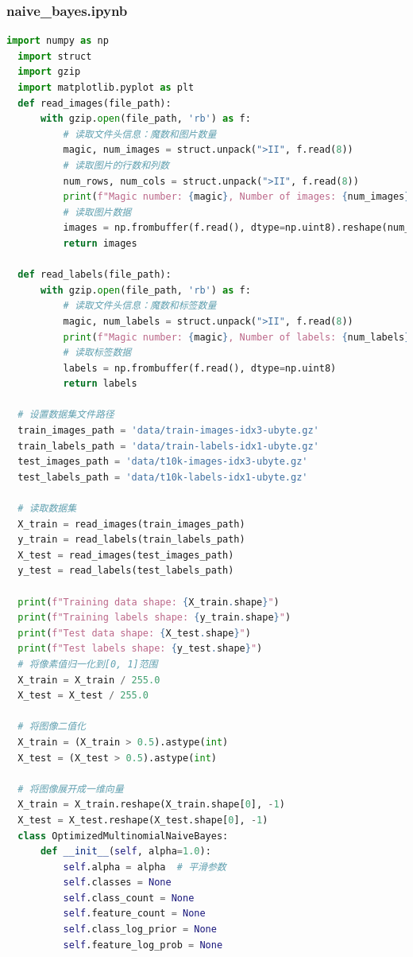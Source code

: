\documentclass[12pt]{article}
\begin{document}
\subsubsection{naive\_bayes.ipynb}
\begin{lstlisting}[language=Python]
  import numpy as np
  import struct
  import gzip
  import matplotlib.pyplot as plt
  def read_images(file_path):
      with gzip.open(file_path, 'rb') as f:
          # 读取文件头信息：魔数和图片数量
          magic, num_images = struct.unpack(">II", f.read(8))
          # 读取图片的行数和列数
          num_rows, num_cols = struct.unpack(">II", f.read(8))
          print(f"Magic number: {magic}, Number of images: {num_images}, Rows: {num_rows}, Columns: {num_cols}")
          # 读取图片数据
          images = np.frombuffer(f.read(), dtype=np.uint8).reshape(num_images, num_rows, num_cols)
          return images
  
  def read_labels(file_path):
      with gzip.open(file_path, 'rb') as f:
          # 读取文件头信息：魔数和标签数量
          magic, num_labels = struct.unpack(">II", f.read(8))
          print(f"Magic number: {magic}, Number of labels: {num_labels}")
          # 读取标签数据
          labels = np.frombuffer(f.read(), dtype=np.uint8)
          return labels
  
  # 设置数据集文件路径
  train_images_path = 'data/train-images-idx3-ubyte.gz'
  train_labels_path = 'data/train-labels-idx1-ubyte.gz'
  test_images_path = 'data/t10k-images-idx3-ubyte.gz'
  test_labels_path = 'data/t10k-labels-idx1-ubyte.gz'
  
  # 读取数据集
  X_train = read_images(train_images_path)
  y_train = read_labels(train_labels_path)
  X_test = read_images(test_images_path)
  y_test = read_labels(test_labels_path)
  
  print(f"Training data shape: {X_train.shape}")
  print(f"Training labels shape: {y_train.shape}")
  print(f"Test data shape: {X_test.shape}")
  print(f"Test labels shape: {y_test.shape}")
  # 将像素值归一化到[0, 1]范围
  X_train = X_train / 255.0
  X_test = X_test / 255.0
  
  # 将图像二值化
  X_train = (X_train > 0.5).astype(int)
  X_test = (X_test > 0.5).astype(int)
  
  # 将图像展开成一维向量
  X_train = X_train.reshape(X_train.shape[0], -1)
  X_test = X_test.reshape(X_test.shape[0], -1)
  class OptimizedMultinomialNaiveBayes:
      def __init__(self, alpha=1.0):
          self.alpha = alpha  # 平滑参数
          self.classes = None
          self.class_count = None
          self.feature_count = None
          self.class_log_prior = None
          self.feature_log_prob = None
  

\end{lstlisting}
\end{document}
